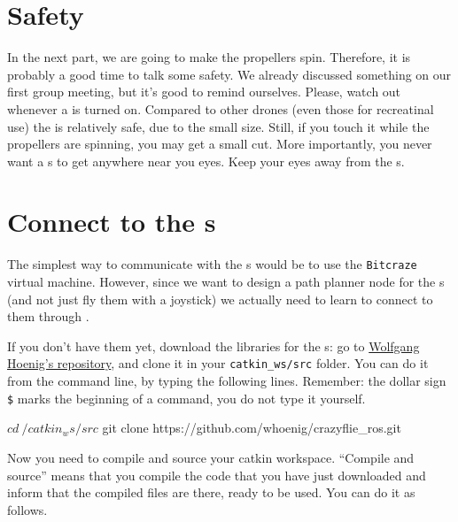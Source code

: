 \section*{Safety}

In the next part, we are going to make the propellers spin.
Therefore, it is probably a good time to talk some safety.
We already discussed something on our first group meeting, but it's good to remind ourselves.
Please, watch out whenever a \CF{} is turned on.
Compared to other drones (even those for recreatinal use) the \CF{} is relatively safe, due to the small size.
Still, if you touch it while the propellers are spinning, you may get a small cut.
More importantly, you never want a \CF{}s to get anywhere near you eyes.
Keep your eyes away from the \CF{}s.







\section*{Connect to the \CF{}s}

The simplest way to communicate with the \CF{}s would be to use the \texttt{Bitcraze} virtual machine.
However, since we want to design a path planner \ROS{} node for the \CF{}s (and not just fly them with a joystick) we actually need to learn to connect to them through \ROS{}.

If you don't have them yet, download the \ROS{} libraries for the \CF{}s:
go to \href{}{Wolfgang Hoenig's repository}, and clone it in your \lstinline|catkin_ws/src| folder.
You can do it from the command line, by typing the following lines.
Remember: the dollar sign \lstinline|$| marks the beginning of a command, you do not type it yourself.

\begin{code}

$ cd ~/catkin_ws/src
$ git clone https://github.com/whoenig/crazyflie_ros.git

\end{code}

Now you need to compile and source your catkin workspace.
``Compile and source'' means that you compile the code that you have just downloaded and inform \ROS{} that the compiled files are there, ready to be used.
You can do it as follows.

